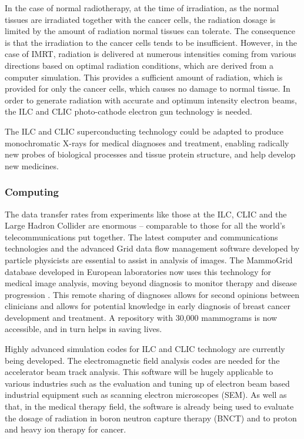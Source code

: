 In the case of normal radiotherapy, at the time of irradiation, as the normal tissues are irradiated together with the cancer cells, the radiation dosage is limited by the amount of radiation normal tissues can tolerate. The consequence is that the irradiation to the cancer cells tends to be insufficient. However, in the case of IMRT, radiation is delivered at numerous intensities coming from various directions based on optimal radiation conditions, which are derived from a computer simulation. This provides a sufficient amount of radiation, which is provided for only the cancer cells, which causes no damage to normal tissue. In order to generate radiation with accurate and optimum intensity electron beams, the ILC and CLIC photo-cathode electron gun technology is needed.
 
The ILC and CLIC superconducting technology could be adapted to produce monochromatic X-rays for medical diagnoses and treatment, enabling radically new probes of biological processes and tissue protein structure, and help develop new medicines.
 
\subsubsection{Computing}

The data transfer rates from experiments like those at the ILC, CLIC and the Large Hadron Collider are enormous – comparable to those for all the world's telecommunications put together. The latest computer and communications technologies and the advanced Grid data flow management software developed by particle physicists are essential to assist in analysis of images. The MammoGrid database developed in European laboratories now uses this technology for medical image analysis, moving beyond diagnosis to monitor therapy and disease progression \cite{CERN:MammoGrid}. This remote sharing of diagnoses allows for second opinions between clinicians and allows for potential knowledge in early diagnosis of breast cancer development and treatment. A repository with 30,000 mammograms is now accessible, and in turn helps in saving lives. \cite{ILC:WhyNeed}
 
Highly advanced simulation codes for ILC and CLIC technology are currently being developed. The electromagnetic field analysis codes are needed for the accelerator beam track analysis. This software will be hugely applicable to various industries such as the evaluation and tuning up of electron beam based industrial equipment such as scanning electron microscopes (SEM). As well as that, in the medical therapy field, the software is already being used to evaluate the dosage of radiation in boron neutron capture therapy (BNCT) and to proton and heavy ion therapy for cancer.

